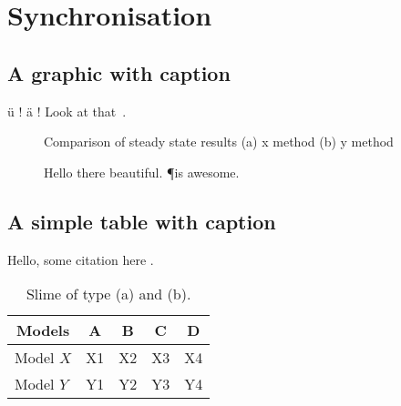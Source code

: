 \chapter{Synchronisation}

\blindtext

\section{A graphic with caption}

ü ! ä ! Look at that~\cite{newman2003structure}.

\begin{figure}
     \centering
     \caption[short toc caption]{Comparison of steady state results (a) x method (b) y method}
     \label{fig:oats}
\end{figure}


\begin{figure}
     \centering
     \caption[another short toc caption]{Hello there beautiful. \P is awesome.}
     \label{fig:slime}
\end{figure}

\section{A simple table with caption}

Hello, some citation here .

\begin{table}
	\centering
	\begin{tabular}{@{} l *4c @{}}
	\toprule
	 \multicolumn{1}{c}{Models}    & A  & B  & C  & D  \\ 
	\midrule
	 Model $X$ & X1 & X2 & X3 & X4 \\ 
	 Model $Y$ & Y1 & Y2 & Y3 & Y4 \\
	\bottomrule
	\end{tabular}
	\caption[another short toc caption]{Slime of type (a) and (b).}
	\label{tab:income}
\end{table}
